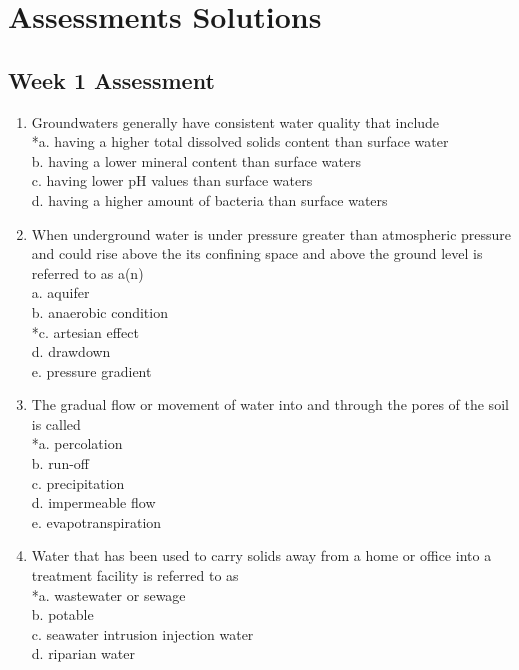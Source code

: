 
\chapter{Assessments Solutions}
\section{Week 1 Assessment}
\begin{enumerate}[1.]
\item Groundwaters generally have consistent water quality that include\\
*a. having a higher total dissolved solids content than surface water\\
b. having a lower mineral content than surface waters\\
c. having lower $\mathrm{pH}$ values than surface waters\\
d. having a higher amount of bacteria than surface waters\\
\item When underground water is under pressure greater than atmospheric pressure and could rise above the its confining space and above the ground level is referred to as a(n)\\
a. aquifer\\
b. anaerobic condition\\
*c. artesian effect\\
d. drawdown\\
e. pressure gradient\\
\item The gradual flow or movement of water into and through the pores of the soil is called\\
*a. percolation\\
b. run-off\\
c. precipitation\\
d. impermeable flow\\
e. evapotranspiration\\
\item Water that has been used to carry solids away from a home or office into a treatment facility is referred to as\\
*a. wastewater or sewage\\
b. potable\\
c. seawater intrusion injection water\\
d. riparian water\\

\end{enumerate}
